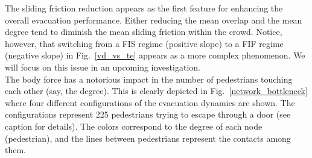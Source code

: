 \documentclass[preprint,12pt]{elsarticle}
\begin{document}
The sliding friction reduction appears as the first feature for enhancing the
overall evacuation performance. Either reducing the mean overlap and the mean
degree tend to diminish the mean sliding  friction within the crowd.  Notice,
however, that switching from a FIS regime (positive slope) to a  FIF  regime
(negative slope) in Fig.~\ref{vd_vs_te} appears as a more complex  phenomenon.
We will focus on this issue in an upcoming investigation.\\

The body force  has a notorious impact in the number of pedestrians touching
each other (say,  the degree). This is clearly depicted in
Fig.~\ref{network_bottleneck} where  four different configurations of the
evacuation dynamics are shown. The  configurations represent 225 pedestrians
trying to escape through a door (see  caption for details). The colors
correspond to the degree of each node  (pedestrian), and the lines between
pedestrians represent the contacts among  them.\\
\end{document}
